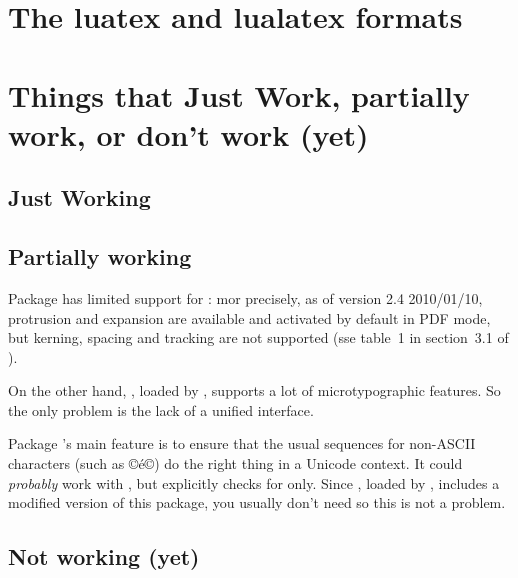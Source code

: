\documentclass{lltxdoc}
\begin{document}
\section{The luatex and lualatex formats}\label{formats}

\section{Things that Just Work, partially work, or don't work (yet)}
\label{workornot}

\subsection{Just Working}\label{working}

\subsection{Partially working}\label{partial}

Package  has limited support for \luatex: mor precisely, as of
version 2.4 2010/01/10, protrusion and expansion are available and activated
by default in PDF mode, but kerning, spacing and tracking are not supported
(sse table~1 in section~3.1 of ).

On the other hand, , loaded by , supports a lot of
microtypographic features. So the only problem is the lack of a unified
interface.

Package 's main feature is to ensure that the usual
sequences for non-ASCII characters (such as ©\'e©) do the right thing in a
Unicode context. It could \emph{probably} work with \luatex, but explicitly
checks for \xetex only. Since , loaded by , includes a
modified version of this package, you usually don't need  so this
is not a problem.

\subsection{Not working (yet)}\label{notworking}
\end{document}
